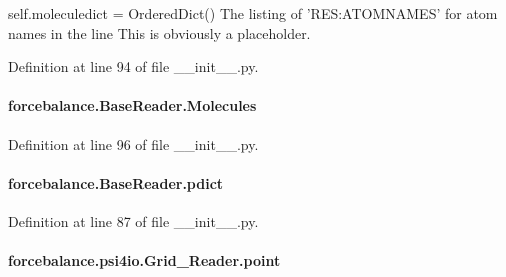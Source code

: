 self.\-moleculedict = Ordered\-Dict() The listing of 'R\-E\-S\-:A\-T\-O\-M\-N\-A\-M\-E\-S' for atom names in the line This is obviously a placeholder. 

Definition at line 94 of file \-\_\-\-\_\-init\-\_\-\-\_\-.\-py.

\hypertarget{classforcebalance_1_1BaseReader_a4369b5fb663a83b11602daa71db6862e}{
\paragraph[{Molecules}]{\setlength{\rightskip}{0pt plus 5cm}forcebalance.\-Base\-Reader.\-Molecules\hspace{0.3cm}{\ttfamily [inherited]}}}\label{classforcebalance_1_1BaseReader_a4369b5fb663a83b11602daa71db6862e}


Definition at line 96 of file \-\_\-\-\_\-init\-\_\-\-\_\-.\-py.

\hypertarget{classforcebalance_1_1BaseReader_aaf18c900d6055ed4b5124f6bb26164c1}{
\paragraph[{pdict}]{\setlength{\rightskip}{0pt plus 5cm}forcebalance.\-Base\-Reader.\-pdict\hspace{0.3cm}{\ttfamily [inherited]}}}\label{classforcebalance_1_1BaseReader_aaf18c900d6055ed4b5124f6bb26164c1}


Definition at line 87 of file \-\_\-\-\_\-init\-\_\-\-\_\-.\-py.

\hypertarget{classforcebalance_1_1psi4io_1_1Grid__Reader_a556a1786a7db1a738a680a784696bf2e}{
\paragraph[{point}]{\setlength{\rightskip}{0pt plus 5cm}forcebalance.\-psi4io.\-Grid\-\_\-\-Reader.\-point}}\label{classforcebalance_1_1psi4io_1_1Grid__Reader_a556a1786a7db1a738a680a784696bf2e}


